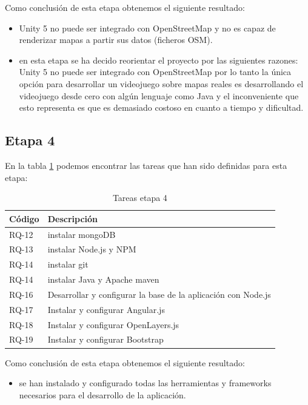 Como conclusión de esta etapa obtenemos el siguiente resultado:
\begin{itemize}
	\item Unity 5 no puede ser integrado con OpenStreetMap y no es capaz de renderizar mapas a partir sus datos (ficheros OSM). 
	\item en esta etapa se ha decido reorientar el proyecto por las siguientes razones: Unity 5 no puede ser integrado con OpenStreetMap por lo tanto la única opción para desarrollar un videojuego sobre mapas reales es desarrollando el videojuego desde cero con algún lenguaje como Java y el inconveniente que esto representa es que es demasiado costoso en cuanto a tiempo y dificultad.  
\end{itemize}

\subsection{Etapa 4}

En la tabla \ref{tabla:requisitosEtapa4} podemos encontrar las tareas que han sido definidas para esta etapa:

\begin{table}[H]
\begin{center}
\begin{tabular}{|p{1.5cm}| p{10.5cm}|}
\hline 
Código & Descripción \\
\hline \hline
RQ-12 & instalar mongoDB\\ \hline
RQ-13 & instalar Node.js y NPM\\ \hline
RQ-14 & instalar git\\ \hline
RQ-14 & instalar Java y Apache maven\\ \hline
RQ-16 & Desarrollar y configurar la base de la aplicación con Node.js\\ \hline
RQ-17 & Instalar y configurar Angular.js\\ \hline
RQ-18 & Instalar y configurar OpenLayers.js\\ \hline
RQ-19 & Instalar y configurar Bootstrap\\ \hline
\end{tabular}
\caption{Tareas etapa 4}
\label{tabla:requisitosEtapa4}
\end{center}
\end{table}

\newpage

Como conclusión de esta etapa obtenemos el siguiente resultado:
\begin{itemize}
	\item se han instalado y configurado todas las herramientas y frameworks necesarios para el desarrollo de la aplicación.
\end{itemize}

